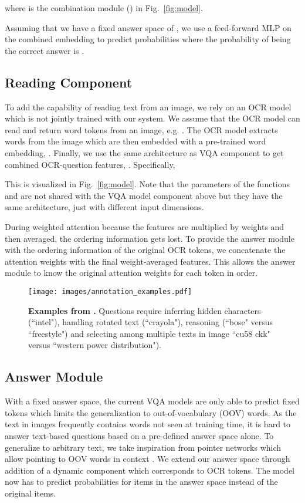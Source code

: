 \documentclass[10pt,twocolumn,letterpaper]{article}
\begin{document}
where  is the combination module () in Fig.~\ref{fig:model}.

Assuming that we have a fixed answer space of , we use a feed-forward MLP  on the combined embedding  to predict probabilities  where the probability of  being the correct answer is . 

\subsection{Reading Component}
\label{subsec:reading}
To add the capability of reading text from an image, we rely on an OCR model which is not jointly trained with our system. We assume that the OCR model can read and return word tokens from an image, e.g. \cite{borisyuk2018rosetta,smith2007overview}. The OCR model extracts  words  from the image which are then embedded with a pre-trained word embedding, . Finally, we use the same architecture as VQA component to get combined OCR-question features, . Specifically, 

This is visualized in Fig.~\ref{fig:model}.
Note that the parameters of the functions  and  are not shared with the VQA model component above but they have the same architecture, just with different input dimensions. 

During weighted attention because the features are multiplied by weights and then averaged, the ordering information gets lost. To provide the answer module with the ordering information of the original OCR tokens, we concatenate the
attention weights with the final weight-averaged features. 
This allows the answer module to know the original attention weights for each token in order. 
\begin{figure*}[ht]
    \centering
    \footnotesize
    \texttt{[image: images/annotation\_examples.pdf]}
    \caption{\textbf{Examples from \datasetName.} Questions require inferring hidden characters (``intel"), handling rotated text (``crayola"), reasoning (``bose" versus ``freestyle") and selecting among multiple texts in image ``cu58 ckk" versus ``western power distribution").
    }
    \label{fig:annotation_examples}
    \vspace{-5mm}
\end{figure*}

\subsection{Answer Module}
\label{subsec:answer_module}

With a fixed answer space, the current VQA models are only able to predict fixed tokens which limits the generalization to out-of-vocabulary (OOV) words. As the text in images frequently contains words not seen at training time, it is hard to answer text-based questions based on a pre-defined answer space alone.
To generalize to arbitrary text,
we take inspiration from pointer networks which allow pointing to OOV words in context \cite{gu2016incorporating,see2017get,merity2016pointer,gulcehre2016pointing,nallapati2016abstractive}. We extend our answer space through addition of a dynamic component which corresponds to  OCR tokens. The model now has to predict probabilities  for  items in the answer space instead of the original  items. 
\end{document}

